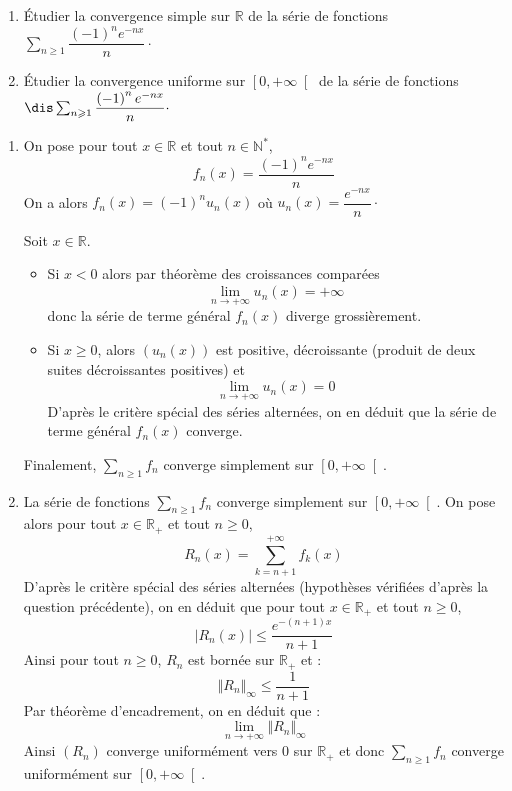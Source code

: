 \documentclass[a4paper,10pt]{report}
\begin{document}
\everymath{\displaystyle}


\begin{center}
\end{center}

\bigskip

\begin{Exercice}{} \begin{enumerate}
\item \'Etudier la convergence simple sur $\mathbb{R}$  de la série de fonctions $\displaystyle\sum_{n\geqslant1}^{} \dfrac{\left(-1\right)^{n}e^{-nx}}{n} \cdot$
\item
\'Etudier la convergence uniforme sur $\left[ 0,+\infty\right[ $  de la série de fonctions $\dis \sum_{n\geqslant1}^{} \dfrac{\left(-1\right)^{n}e^{-nx}}{n} \cdot$
\end{enumerate}
\end{Exercice}

\corr \begin{enumerate}

\item On pose pour tout $x\in\mathbb{R}$ et tout $n\in\mathbb{N}^*$, 
$$f_n(x)=\dfrac{\left(-1\right)^{n}e^{-nx}}{n}$$
On a alors $f_n(x)=(-1)^nu_n(x)$ où $u_n(x)=\dfrac{e^{-nx}}{n} \cdot$

\noindent Soit $x \in \mathbb{R}$.
\begin{itemize}
\item Si $x<0$ alors par théorème des croissances comparées
$$\lim\limits_{n\to +\infty}^{} u_n(x) =+\infty$$
donc la série de terme général $f_n(x)$ diverge grossièrement.
\item Si $x\geq 0$, alors $(u_n(x))$ est positive, décroissante (produit de deux suites décroissantes positives) et 
$$\lim\limits_{n\to +\infty}^{}u_n(x)=0$$
D'après le critère spécial des séries alternées, on en déduit que la série de terme général $f_n(x)$ converge.
\end{itemize}
Finalement, $\displaystyle\sum\limits_{n\geqslant1}^{}f_n$ converge simplement sur $\left[ 0,+\infty\right[$.
\item La série de fonctions $\displaystyle\sum\limits_{n\geqslant1}^{}f_n$ converge simplement sur $\left[ 0,+\infty\right[ $. On pose alors pour tout $x \in \mathbb{R}_+$ et tout $n \geq 0$, 
$$ R_n(x)=\displaystyle\sum\limits_{k=n+1}^{+\infty}f_k(x)$$
D'après le critère spécial des séries alternées (hypothèses vérifiées d'après la question précédente), on en déduit que pour tout $x \in \mathbb{R}_+$ et tout $n \geq 0$,
$$|R_n(x)|\leqslant \dfrac{e^{-(n+1)x}}{n+1}$$
Ainsi pour tout $n \geq 0$, $R_n$ est bornée sur $\mathbb{R}_+$ et :
$$\Vert R_n \Vert_{\infty}\leq \dfrac{1}{n+1}$$
Par théorème d'encadrement, on en déduit que :
$$ \lim_{n \rightarrow + \infty} \Vert R_n \Vert_{\infty}$$
Ainsi $(R_n)$ converge uniformément vers $0$ sur $\mathbb{R}_+$ et donc $\displaystyle\sum\limits_{n\geqslant1}^{}f_n$ converge uniformément sur $\left[ 0,+\infty\right[ $.
\end{enumerate}
\end{document}
